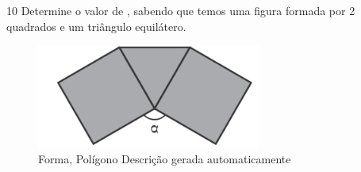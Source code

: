 \begin{escolha}
\begin{boxmedio}
\begin{boxmedio}
{\begin{boxpeq}
\begin{boxpeq}
{\begin{boxpeq}
\begin{boxmedio}
\begin{boxmedio}
\begin{boxpeq}
\begin{boxmedio}
\begin{boxpeq}
\begin{boxpeq}
\begin{boxpeq}
\begin{boxpeq}
\begin{boxmedio}
{\begin{boxmedio}
\begin{boxmedio}
\begin{boxpeq}
\begin{boxmedio}
\begin{boxpeq}
\begin{boxpeq}
\begin{boxpeq}
\begin{escolha}
{\begin{boxmedio}
\begin{boxpeq}
\begin{boxpeq}
\begin{boxpeq}
\begin{boxpeq}
\begin{boxpeq}
\begin{boxmedio}
\begin{boxpeq}
\begin{boxpeq}
\begin{boxpeq}
{\begin{boxpeq}
\begin{boxmedio}
\begin{boxpeq}
\begin{boxpeq}
\begin{boxpeq}
{\begin{boxpeq}
\begin{boxmedio}
{\begin{boxpeq}
\begin{boxpeq}
\begin{boxmedio}
\begin{boxmedio}
\begin{boxpeq}
\begin{boxpeq}
{\begin{boxpeq}
\begin{boxpeq}
\begin{boxpeq}
\begin{boxpeq}
\begin{boxpeq}
\begin{escolha}
\begin{escolha}
{\begin{boxmedio}
\begin{boxpeq}
\begin{q°}
\begin{boxmedio}
\begin{boxpeq}
\begin{boxpeq}
\begin{boxmedio}
\begin{boxmedio}
\begin{boxmedio}
\begin{figure}
\end{figure}



\num{10} Determine o valor de \alpha, sabendo que temos uma figura formada por 2
quadrados e um triângulo equilátero.

\begin{figure}
\centering
\includegraphics[width=2.90025in,height=1.35012in]{./_SAEB_9_MAT/media/image190.png}
\caption{Forma, Polígono Descrição gerada automaticamente}
\end{figure}



\end{boxmedio}
\end{boxmedio}
\end{boxmedio}
\end{boxpeq}
\end{boxpeq}
\end{boxmedio}
\end{q°}
\end{boxpeq}
\end{boxmedio}}
\end{escolha}
\end{escolha}
\end{boxpeq}
\end{boxpeq}
\end{boxpeq}
\end{boxpeq}
\end{boxpeq}}
\end{boxpeq}
\end{boxpeq}
\end{boxmedio}
\end{boxmedio}
\end{boxpeq}
\end{boxpeq}}
\end{boxmedio}
\end{boxpeq}}
\end{boxpeq}
\end{boxpeq}
\end{boxpeq}
\end{boxmedio}
\end{boxpeq}}
\end{boxpeq}
\end{boxpeq}
\end{boxpeq}
\end{boxmedio}
\end{boxpeq}
\end{boxpeq}
\end{boxpeq}
\end{boxpeq}
\end{boxpeq}
\end{boxmedio}}
\end{escolha}
\end{boxpeq}
\end{boxpeq}
\end{boxpeq}
\end{boxmedio}
\end{boxpeq}
\end{boxmedio}
\end{boxmedio}}
\end{boxmedio}
\end{boxpeq}
\end{boxpeq}
\end{boxpeq}
\end{boxpeq}
\end{boxmedio}
\end{boxpeq}
\end{boxmedio}
\end{boxmedio}
\end{boxpeq}}
\end{boxpeq}
\end{boxpeq}}
\end{boxmedio}
\end{boxmedio}
\end{escolha}
